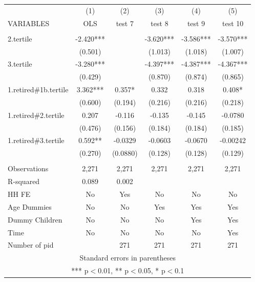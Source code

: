 \begin{tabular}{lccccc} \hline
 & (1) & (2) & (3) & (4) & (5) \\
VARIABLES & OLS & test 7 & test 8 & test 9 & test 10 \\ \hline
 &  &  &  &  &  \\
2.tertile & -2.420*** &  & -3.620*** & -3.586*** & -3.570*** \\
 & (0.501) &  & (1.013) & (1.018) & (1.007) \\
3.tertile & -3.280*** &  & -4.397*** & -4.387*** & -4.367*** \\
 & (0.429) &  & (0.870) & (0.874) & (0.865) \\
1.retired\#1b.tertile & 3.362*** & 0.357* & 0.332 & 0.318 & 0.408* \\
 & (0.600) & (0.194) & (0.216) & (0.216) & (0.218) \\
1.retired\#2.tertile & 0.207 & -0.116 & -0.135 & -0.145 & -0.0780 \\
 & (0.476) & (0.156) & (0.184) & (0.184) & (0.185) \\
1.retired\#3.tertile & 0.592** & -0.0329 & -0.0603 & -0.0670 & -0.00242 \\
 & (0.270) & (0.0880) & (0.128) & (0.128) & (0.129) \\
 &  &  &  &  &  \\
Observations & 2,271 & 2,271 & 2,271 & 2,271 & 2,271 \\
R-squared & 0.089 & 0.002 &  &  &  \\
HH FE & No & Yes & No & No & No \\
Age Dummies & No & No & Yes & Yes & Yes \\
Dummy Children & No & No & No & Yes & Yes \\
Time & No & No & No & No & Yes \\
 Number of pid &  & 271 & 271 & 271 & 271 \\ \hline
\multicolumn{6}{c}{ Standard errors in parentheses} \\
\multicolumn{6}{c}{ *** p$<$0.01, ** p$<$0.05, * p$<$0.1} \\
\end{tabular}
